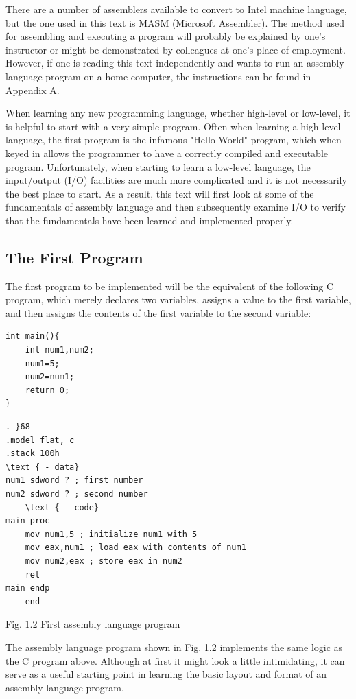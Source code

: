 \documentclass[10pt]{article}
\begin{document}
There are a number of assemblers available to convert to Intel machine language, but the one used in this text is MASM (Microsoft Assembler). The method used for assembling and executing a program will probably be explained by one's instructor or might be demonstrated by colleagues at one's place of employment. However, if one is reading this text independently and wants to run an assembly language program on a home computer, the instructions can be found in Appendix A.

When learning any new programming language, whether high-level or low-level, it is helpful to start with a very simple program. Often when learning a high-level language, the first program is the infamous "Hello World" program, which when keyed in allows the programmer to have a correctly compiled and executable program. Unfortunately, when starting to learn a low-level language, the input/output (I/O) facilities are much more complicated and it is not necessarily the best place to start. As a result, this text will first look at some of the fundamentals of assembly language and then subsequently examine I/O to verify that the fundamentals have been learned and implemented properly.

\subsection*{The First Program}
The first program to be implemented will be the equivalent of the following C program, which merely declares two variables, assigns a value to the first variable, and then assigns the contents of the first variable to the second variable:

\begin{verbatim}
int main(){
    int num1,num2;
    num1=5;
    num2=num1;
    return 0;
}
\end{verbatim}

\begin{verbatim}
. }68
.model flat, c
.stack 100h
\text { - data}
num1 sdword ? ; first number
num2 sdword ? ; second number
    \text { - code}
main proc
    mov num1,5 ; initialize num1 with 5
    mov eax,num1 ; load eax with contents of num1
    mov num2,eax ; store eax in num2
    ret
main endp
    end
\end{verbatim}

Fig. 1.2 First assembly language program

The assembly language program shown in Fig. 1.2 implements the same logic as the C program above. Although at first it might look a little intimidating, it can serve as a useful starting point in learning the basic layout and format of an assembly language program.
\end{document}
